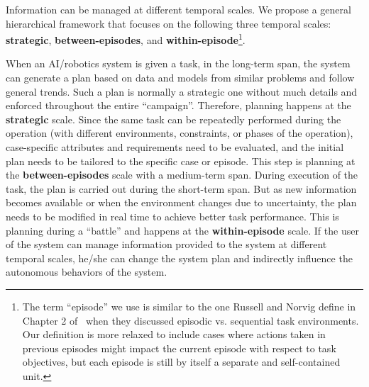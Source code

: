Information can be managed at different temporal scales. 
We propose a general hierarchical framework that focuses on the following three temporal scales: \textbf{strategic}, \textbf{between-episodes}, and \textbf{within-episode}\footnote{The term ``episode'' we use is similar to the one Russell and Norvig define in Chapter 2 of~\cite{Russell2009Artificial} when they discussed episodic vs. sequential task environments. Our definition is more relaxed to include cases where actions taken in previous episodes might impact the current episode with respect to task objectives, but each episode is still by itself a separate and self-contained unit.}. 

When an AI/robotics system is given a task, in the long-term span, the system can generate a plan based on data and models from similar problems and follow general trends.  Such a plan is normally a strategic one without much details and enforced throughout the entire ``campaign''. Therefore, planning happens at the \textbf{strategic} scale. Since the same task can be repeatedly performed during the operation (with different environments, constraints, or phases of the operation), case-specific attributes and requirements need to be evaluated, and the initial plan needs to be tailored to the specific case or episode. This step is planning at the \textbf{between-episodes} scale with a medium-term span. During execution of the task, the plan is carried out during the short-term span. But as new information becomes available or when the environment changes due to uncertainty, the plan needs to be modified in real time to achieve better task performance. This is planning during a ``battle'' and happens at the \textbf{within-episode} scale. If the user of the system can manage information provided to the system at different temporal scales, he/she can change the system plan and indirectly influence the autonomous behaviors of the system.

